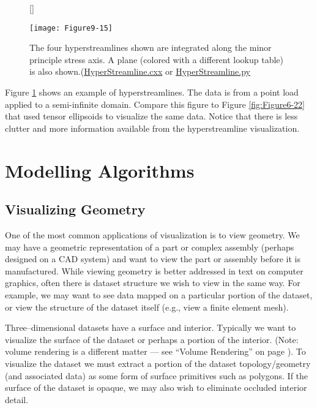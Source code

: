 \begin{figure}[!htb]
	[\FBwidth]
	{\caption{The four hyperstreamlines shown are integrated along the minor principle stress axis. A plane (colored with a different lookup table) is also shown.(\href{https://lorensen.github.io/VTKExamples/site/Cxx/VisualizationAlgorithms/HyperStreamline/}{HyperStreamline.cxx} or \href{https://lorensen.github.io/VTKExamples/site/Python/VisualizationAlgorithms/HyperStreamline/}{HyperStreamline.py}}\label{fig:Figure9-15}}
	{\texttt{[image: Figure9-15]}}
\end{figure}


Figure \ref{fig:Figure9-15} shows an example of hyperstreamlines. The data is from a point load applied to a semi-infinite domain. Compare this figure to Figure \ref{fig:Figure6-22} that used tensor ellipsoids to visualize the same data. Notice that there is less clutter and more information available from the hyperstreamline visualization.



\section{Modelling Algorithms}

\subsection{Visualizing Geometry}

One of the most common applications of visualization is to view geometry. We may have a geometric representation of a part or complex assembly (perhaps designed on a CAD system) and want to view the part or assembly before it is manufactured. While viewing geometry is better addressed in text on computer graphics, often there is dataset structure we wish to view in the same way. For example, we may want to see data mapped on a particular portion of the dataset, or view the structure of the dataset itself (e.g., view a finite element mesh).

Three--dimensional datasets have a surface and interior. Typically we want to visualize the surface of the dataset or perhaps a portion of the interior. (Note: volume rendering is a different matter --- see ``Volume Rendering'' on page \pageref{sec:volume_rendering}). To visualize the dataset we must extract a portion of the dataset topology/geometry (and associated data) as some form of surface primitives such as polygons. If the surface of the dataset is opaque, we may also wish to eliminate occluded interior detail.

